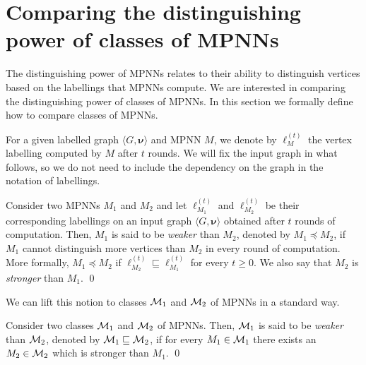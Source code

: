 \section{Comparing the distinguishing power of classes of MPNNs}\label{subsec:compare}
The distinguishing power of MPNNs relates to their ability to distinguish vertices based on the labellings that MPNNs compute. We are interested in comparing the distinguishing power of classes of MPNNs. In this section we formally define how to compare classes of MPNNs.

For a given labelled graph $\langle G,\pmb{\nu}\rangle$ and MPNN $M$, we denote by 
$\pmb{\ell}_M^{(t)}$ the vertex labelling computed by $M$ after $t$ rounds. We will fix the input graph in what follows, so we do not need to include the dependency on the graph in the notation of labellings.

\begin{definition}\label{def:mpnnweak}\normalfont
Consider two MPNNs $M_1$ and $M_2$ and let $\pmb{\ell}_{M_1}^{(t)}$ and $\pmb{\ell}_{M_2}^{(t)}$  be their corresponding labellings on an input graph $\langle G,\pmb{\nu}\rangle$ obtained after $t$ rounds of computation. Then,
$M_1$ is said to be \textit{weaker} than $M_2$, denoted by $M_1\preceq M_2$, if $M_1$ cannot distinguish more vertices  than $M_2$ in every round of computation. More formally, $M_1\preceq M_2$ if $\pmb{\ell}_{M_2}^{(t)}\sqsubseteq
\pmb{\ell}_{M_1}^{(t)}$ for every $t\geq 0$. We also say that $M_2$ is \textit{stronger} than $M_1$. \qed
\end{definition}
We can lift this notion to classes  $\mathcal{M}_1$ and $\mathcal{M}_2$ of MPNNs in a standard way. 

\begin{definition}\label{def:classesweak}\normalfont
Consider two classes $\mathcal{M}_1$ and $\mathcal{M}_2$ of MPNNs.
Then, $\mathcal{M}_1$ is said to be \textit{weaker} than $\mathcal{M}_2$, denoted by 
$\mathcal{M}_1\sqsubseteq \mathcal{M}_2$, if for every $M_1\in \mathcal{M}_1$
there exists an $M_2\in\mathcal{M}_2$ which is stronger than $M_1$. \qed
\end{definition}

